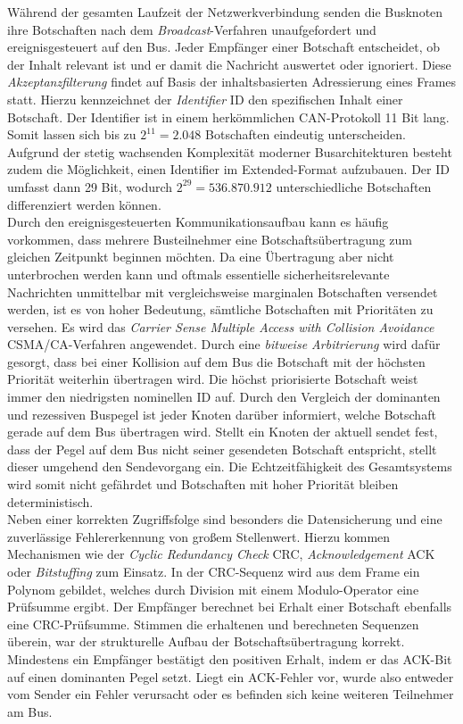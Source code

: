 Während der gesamten Laufzeit der Netzwerkverbindung senden die Busknoten ihre Botschaften nach dem \emph{Broadcast}-Verfahren unaufgefordert und ereignisgesteuert auf den Bus. Jeder Empfänger einer Botschaft entscheidet, ob der Inhalt relevant ist und er damit die Nachricht auswertet oder ignoriert. Diese \emph{Akzeptanzfilterung} findet auf Basis der inhaltsbasierten Adressierung eines Frames statt. Hierzu kennzeichnet der \emph{Identifier} \acs{ID} den spezifischen Inhalt einer Botschaft. Der Identifier ist in einem herkömmlichen \acs{CAN}-Protokoll 11 Bit lang. Somit lassen sich bis zu $2^{11} = 2.048$ Botschaften eindeutig unterscheiden. Aufgrund der stetig wachsenden Komplexität moderner Busarchitekturen besteht zudem die Möglichkeit, einen Identifier im Extended-Format aufzubauen. Der \acs{ID} umfasst dann 29 Bit, wodurch $2^{29} = 536.870.912$ unterschiedliche Botschaften differenziert werden können.\\
Durch den ereignisgesteuerten Kommunikationsaufbau kann es häufig vorkommen, dass mehrere Busteilnehmer eine Botschaftsübertragung zum gleichen Zeitpunkt beginnen möchten. Da eine Übertragung aber nicht unterbrochen werden kann und oftmals essentielle sicherheitsrelevante Nachrichten unmittelbar mit vergleichsweise marginalen Botschaften versendet werden, ist es von hoher Bedeutung, sämtliche Botschaften mit Prioritäten zu versehen. Es wird das \emph{Carrier Sense Multiple Access with Collision Avoidance} \acs{CSMA/CA}-Verfahren angewendet. Durch eine \emph{bitweise Arbitrierung} wird dafür gesorgt, dass bei einer Kollision auf dem Bus die Botschaft mit der höchsten Priorität weiterhin übertragen wird. Die höchst priorisierte Botschaft weist immer den niedrigsten nominellen \acs{ID} auf. Durch den Vergleich der dominanten und rezessiven Buspegel ist jeder Knoten darüber informiert, welche Botschaft gerade auf dem Bus übertragen wird. Stellt ein Knoten der aktuell sendet fest, dass der Pegel auf dem Bus nicht seiner gesendeten Botschaft entspricht, stellt dieser umgehend den Sendevorgang ein. Die Echtzeitfähigkeit des Gesamtsystems wird somit nicht gefährdet und Botschaften mit hoher Priorität bleiben deterministisch. \\
Neben einer korrekten Zugriffsfolge sind besonders die Datensicherung und eine zuverlässige Fehlererkennung von großem Stellenwert. Hierzu kommen Mechanismen wie der \emph{Cyclic Redundancy Check} \acs{CRC}, \emph{Acknowledgement} \acs{ACK} oder \emph{Bitstuffing} zum Einsatz. In der \acs{CRC}-Sequenz wird aus dem Frame ein Polynom gebildet, welches durch Division mit einem Modulo-Operator eine Prüfsumme ergibt. Der Empfänger berechnet bei Erhalt einer Botschaft ebenfalls eine \acs{CRC}-Prüfsumme. Stimmen die erhaltenen und berechneten Sequenzen überein, war der strukturelle Aufbau der Botschaftsübertragung korrekt. Mindestens ein Empfänger bestätigt den positiven Erhalt, indem er das \acs{ACK}-Bit auf einen dominanten Pegel setzt. Liegt ein \acs{ACK}-Fehler vor, wurde also entweder vom Sender ein Fehler verursacht oder es befinden sich keine weiteren Teilnehmer am Bus.\\
